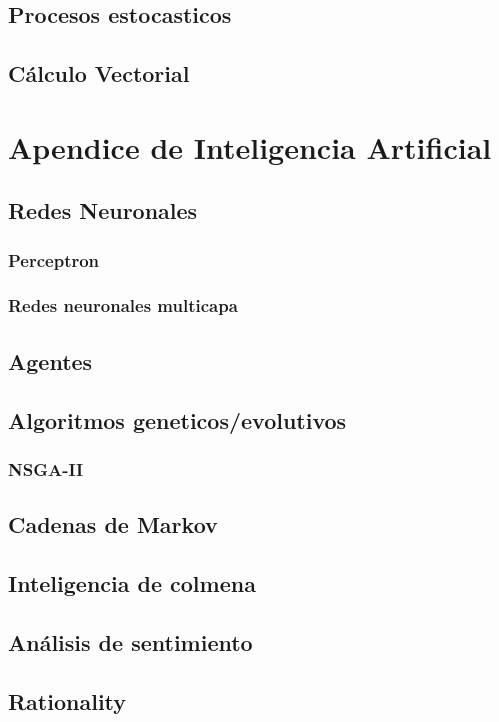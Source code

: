     \section{Procesos estocasticos}
    \section{Cálculo Vectorial}
    
\chapter{Apendice de Inteligencia Artificial}
    \section{Redes Neuronales}
        \subsection{Perceptron}
        \subsection{Redes neuronales multicapa}
    \section{Agentes}
    \section{Algoritmos geneticos/evolutivos}
        \subsection{NSGA-II}
    \section{Cadenas de Markov}
    \section{Inteligencia de colmena}
    \section{Análisis de sentimiento}
    \section{Rationality}
    
